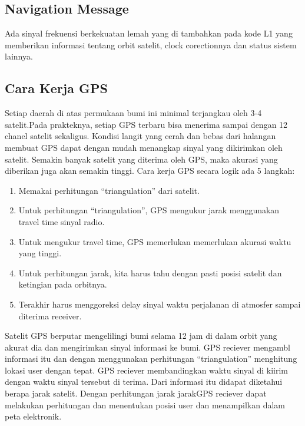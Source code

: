 \subsection{Navigation Message}
Ada sinyal frekuensi berkekuatan lemah yang di tambahkan pada kode L1 yang memberikan informasi tentang orbit satelit, clock corectionnya dan status sistem lainnya.

\subsection{Cara Kerja GPS}
Setiap daerah di atas permukaan bumi ini minimal terjangkau oleh 3-4 satelit.Pada prakteknya, setiap GPS terbaru bisa menerima sampai dengan 12 chanel satelit sekaligus. Kondisi langit yang cerah dan bebas dari halangan membuat GPS dapat dengan mudah menangkap sinyal yang dikirimkan oleh satelit. Semakin banyak satelit yang diterima oleh GPS, maka akurasi yang diberikan juga akan semakin tinggi.
Cara kerja GPS secara logik ada 5 langkah:
\begin{enumerate}
	\item Memakai perhitungan “triangulation” dari satelit.
	\item Untuk perhitungan “triangulation”, GPS mengukur jarak menggunakan travel time sinyal radio.
	\item Untuk mengukur travel time, GPS memerlukan memerlukan akurasi waktu yang tinggi.
	\item Untuk perhitungan jarak, kita harus tahu dengan pasti posisi satelit dan ketingian pada orbitnya.
	\item Terakhir harus menggoreksi delay sinyal waktu perjalanan di atmosfer sampai diterima receiver.
\end{enumerate}

Satelit GPS berputar mengelilingi bumi selama 12 jam di dalam orbit yang akurat dia dan mengirimkan sinyal informasi ke bumi. GPS reciever mengambl informasi itu dan dengan menggunakan perhitungan “triangulation” menghitung lokasi user dengan tepat. GPS reciever membandingkan waktu sinyal di kiirim dengan waktu sinyal tersebut di terima. Dari informasi itu didapat diketahui berapa jarak satelit. Dengan perhitungan jarak jarakGPS reciever dapat melakukan perhitungan dan menentukan posisi user dan menampilkan dalam peta elektronik.

